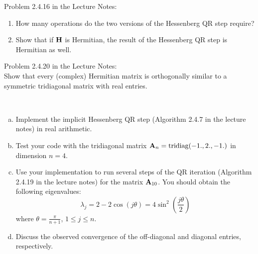 
\begin{Sheet}
  \label{sheet5}

  \begin{Problem}
  	Problem 2.4.16 in the Lecture Notes:
  	\begin{enumerate}
  		\item How many operations do the two versions of the Hessenberg QR step require?
  		\item Show that if $\mathbf H$ is Hermitian, the result of the
  		Hessenberg QR step is Hermitian as well.
  	\end{enumerate}
  \end{Problem}

  \begin{Problem}
	Problem 2.4.20 in the Lecture Notes:\\
	Show that every (complex) Hermitian matrix is orthogonally similar
	to a symmetric tridiagonal matrix with real entries.
  \end{Problem}

\begin{Problem}
	\hfill\\\vspace{-6ex}
	\begin{enumerate}[(a)]
		\item Implement the implicit Hessenberg QR step (Algorithm 2.4.7 in the
		lecture notes) in real arithmetic.
		\item Test your code with the tridiagonal matrix
		$\mathbf A_n=\operatorname{tridiag}(-1.,2.,-1.)$ in dimension $n=4$.
		\item Use your implementation to run several steps of the QR
		iteration (Algorithm 2.4.19 in the lecture notes) for the matrix
		$\mathbf A_{10}$.
		You should obtain the following eigenvalues:
		\begin{equation*}
		\lambda_j = 2 - 2\cos(j\theta) = 4\sin^2\left(\frac{j\theta}{2}\right)
		\end{equation*}
		where $\theta = \frac{\pi}{n+1}$, $1 \leq j \leq n$.
		\item Discuss the observed convergence of the off-diagonal and
		diagonal entries, respectively.
	\end{enumerate}
\end{Problem}


\end{Sheet}
